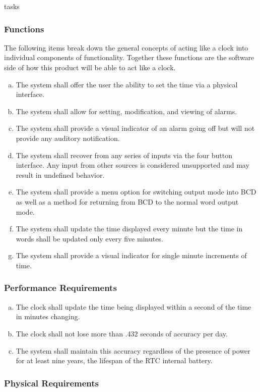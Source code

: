 tasks\documentclass[onecolumn, draftclsnofoot,10pt, compsoc]{IEEEtran}
\begin{document}
\subsubsection{Functions}
The following items break down the general concepts of acting like a clock into individual
components of functionality. Together these functions are the software side of
how this product will be able to act like a clock.
\begin{enumerate}[a)]
  \item The system shall offer the user the ability to set the time via a
  physical interface.
  \item
  The system shall allow for setting, modification, and viewing of alarms.
  \item
  The system shall provide a visual indicator of an alarm going off but will not
  provide any auditory notification.
  \item
  The system shall recover from any series of inputs via the four button
  interface. Any input from other sources is considered unsupported and may result
  in undefined behavior.
  \item
  The system shall provide a menu option for switching output mode into BCD as
  well as a method for returning from BCD to the normal word output mode.
  \item
  The system shall update the time displayed every minute but the time in words
  shall be updated only every five minutes.
  \item
  The system shall provide a visual indicator for single minute increments of
  time.
\end{enumerate}

\subsubsection{Performance Requirements}
\begin{enumerate}[a)]
  \item The clock shall update the time being displayed within a second of the
  time in minutes changing.
  \item The clock shall not lose more than .432 seconds of accuracy per day.
  \item The system shall maintain this accuracy regardless of the presence of
  power for at least nine years, the lifespan of the RTC internal battery.
\end{enumerate}

\subsubsection{Physical Requirements}
\end{document}
